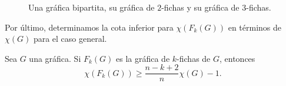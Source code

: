 \begin{figure}[ht!]
\caption{Una gr\'afica bipartita, su gr\'afica de $2$-fichas y su gr\'afica de
 $3$-fichas.}
\label{fig:ex-bip}
\end{figure}

\pagebreak

Por \'ultimo, determinamos la cota inferior para $\chi (F_k(G))$ en t\'erminos
de $\chi (G)$ para el caso general.

\begin{teorema}
\label{teo:numCrom-k}
    Sea $G$ una gr\'afica. Si $F_k(G)$ es la gr\'afica de $k$-fichas de $G$,
    entonces
    \[
        \chi(F_k(G)) \geq \frac{n-k+2}{n} \chi(G) -1.
    \]
\end{teorema}

